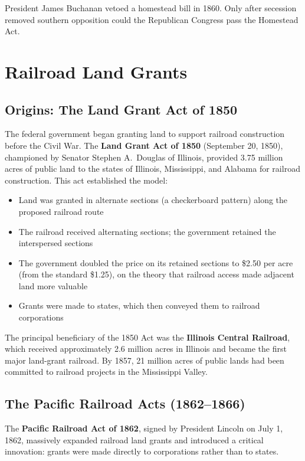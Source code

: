 \documentclass[12pt]{article}
\begin{document}
President James Buchanan vetoed a homestead bill in 1860.  Only after secession removed southern opposition could the Republican Congress pass the Homestead Act.


\section{Railroad Land Grants}\label{sec:railroads}

\subsection{Origins: The Land Grant Act of 1850}

The federal government began granting land to support railroad construction before the Civil War.  The \textbf{Land Grant Act of 1850} (September 20, 1850), championed by Senator Stephen A.\ Douglas of Illinois, provided 3.75 million acres of public land to the states of Illinois, Mississippi, and Alabama for railroad construction.  This act established the model:

\begin{itemize}
\item Land was granted in alternate sections (a checkerboard pattern) along the proposed railroad route
\item The railroad received alternating sections; the government retained the interspersed sections
\item The government doubled the price on its retained sections to \$2.50 per acre (from the standard \$1.25), on the theory that railroad access made adjacent land more valuable
\item Grants were made to states, which then conveyed them to railroad corporations
\end{itemize}

The principal beneficiary of the 1850 Act was the \textbf{Illinois Central Railroad}, which received approximately 2.6 million acres in Illinois and became the first major land-grant railroad.  By 1857, 21 million acres of public lands had been committed to railroad projects in the Mississippi Valley.

\subsection{The Pacific Railroad Acts (1862--1866)}

The \textbf{Pacific Railroad Act of 1862}, signed by President Lincoln on July 1, 1862, massively expanded railroad land grants and introduced a critical innovation: grants were made directly to corporations rather than to states.
\end{document}

